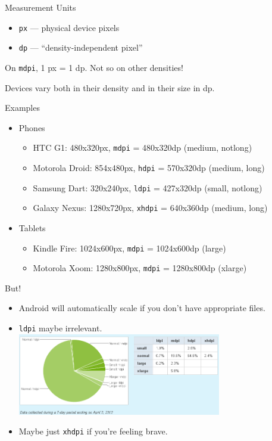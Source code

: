 \documentclass{beamer}
\begin{document}
\begin{frame}{Measurement Units}
\begin{itemize}
\item \texttt{px} --- physical device pixels
\item \texttt{dp} --- ``density-independent pixel''
\end{itemize}
On \texttt{mdpi}, 1 px = 1 dp. Not so on other densities!

Devices vary both in their density and in their size in dp.
\end{frame}

\begin{frame}{Examples}

\begin{itemize}
\item Phones
\begin{itemize}
\item HTC G1: 480x320px, \texttt{mdpi} = 480x320dp (medium, notlong)
\item Motorola Droid: 854x480px, \texttt{hdpi} = 570x320dp (medium, long)
\item Samsung Dart: 320x240px, \texttt{ldpi} = 427x320dp (small, notlong)
\item Galaxy Nexus: 1280x720px, \texttt{xhdpi} = 640x360dp (medium,
  long)
\end{itemize}
\item Tablets
\begin{itemize}
\item Kindle Fire: 1024x600px, \texttt{mdpi} = 1024x600dp (large)
\item Motorola Xoom: 1280x800px, \texttt{mdpi} = 1280x800dp (xlarge)
\end{itemize}
\end{itemize}
\end{frame}

\begin{frame}{But!}
\begin{itemize}
\item Android will automatically scale if you don't have appropriate
  files.
\item \texttt{ldpi} maybe irrelevant.\\
\includegraphics[width=3.5in]{densities.png}
\item Maybe just \texttt{xhdpi} if you're feeling brave.
\end{itemize}
\end{frame}
\end{document}

